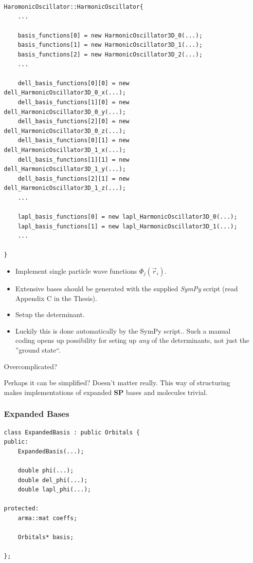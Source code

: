 \documentclass{beamer}
\begin{document}
\begin{frame}[containsverbatim]
\scriptsize
 \begin{verbatim}
HaromonicOscillator::HarmonicOscillator{
    ...

    basis_functions[0] = new HarmonicOscillator3D_0(...);
    basis_functions[1] = new HarmonicOscillator3D_1(...);
    basis_functions[2] = new HarmonicOscillator3D_2(...);
    ...

    dell_basis_functions[0][0] = new dell_HarmonicOscillator3D_0_x(...);
    dell_basis_functions[1][0] = new dell_HarmonicOscillator3D_0_y(...);
    dell_basis_functions[2][0] = new dell_HarmonicOscillator3D_0_z(...);
    dell_basis_functions[0][1] = new dell_HarmonicOscillator3D_1_x(...);
    dell_basis_functions[1][1] = new dell_HarmonicOscillator3D_1_y(...);
    dell_basis_functions[2][1] = new dell_HarmonicOscillator3D_1_z(...);
    ...

    lapl_basis_functions[0] = new lapl_HarmonicOscillator3D_0(...);
    lapl_basis_functions[1] = new lapl_HarmonicOscillator3D_1(...);
    ...
    
}
 \end{verbatim}
\normalsize
 
\end{frame}

\begin{frame}

 \begin{itemize}
    \item Implement single particle wave functions $\Phi_j(\vec r_i)$.
    \item Extensive bases should be generated with the supplied \textit{SymPy} script (read Appendix C in the Thesis).
    \item Setup the determinant.
    \item Luckily this is done automatically by the SymPy script.. Such a manual coding opens up possibility for seting up \textit{any} of the determinants, not just the ''ground state``.
\end{itemize}

\pause

Overcomplicated?

\pause 

Perhaps it can be simplified? Doesn't matter really. This way of structuring makes implementations of expanded \textbf{SP} bases and molecules trivial.

\end{frame}

\begin{frame}[containsverbatim]\frametitle{Expanded Bases}
\scriptsize
\begin{verbatim}
class ExpandedBasis : public Orbitals {
public:
    ExpandedBasis(...);

    double phi(...);
    double del_phi(...);
    double lapl_phi(...);
    
protected:
    arma::mat coeffs;

    Orbitals* basis;

};
\end{verbatim}
\normalsize
\end{frame}
\end{document}
